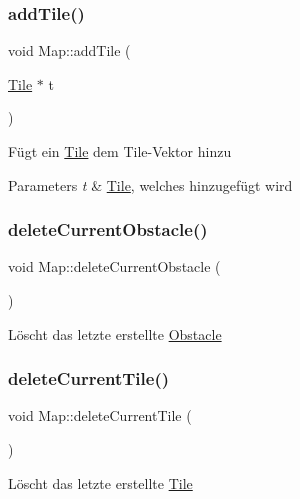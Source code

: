 \subsubsection{\texorpdfstring{add\+Tile()}{addTile()}}
{\footnotesize\ttfamily void Map\+::add\+Tile (\begin{DoxyParamCaption}\item[{\mbox{\hyperlink{class_tile}{Tile}} $\ast$}]{t }\end{DoxyParamCaption})}

Fügt ein \mbox{\hyperlink{class_tile}{Tile}} dem Tile-\/\+Vektor hinzu 
\begin{DoxyParams}{Parameters}
{\em t} & \mbox{\hyperlink{class_tile}{Tile}}, welches hinzugefügt wird \\
\hline
\end{DoxyParams}
\mbox{\label{class_map_ac29cdcf87495d5335655ab55f890a57e}} 
\subsubsection{\texorpdfstring{delete\+Current\+Obstacle()}{deleteCurrentObstacle()}}
{\footnotesize\ttfamily void Map\+::delete\+Current\+Obstacle (\begin{DoxyParamCaption}{ }\end{DoxyParamCaption})}

Löscht das letzte erstellte \mbox{\hyperlink{class_obstacle}{Obstacle}} \mbox{\label{class_map_a89bab8e9b24c94b2696d624dac43cffa}} 
\subsubsection{\texorpdfstring{delete\+Current\+Tile()}{deleteCurrentTile()}}
{\footnotesize\ttfamily void Map\+::delete\+Current\+Tile (\begin{DoxyParamCaption}{ }\end{DoxyParamCaption})}

Löscht das letzte erstellte \mbox{\hyperlink{class_tile}{Tile}} \mbox{\label{class_map_aaad5b40b9c748b23da1cb3420e0c86de}} 
